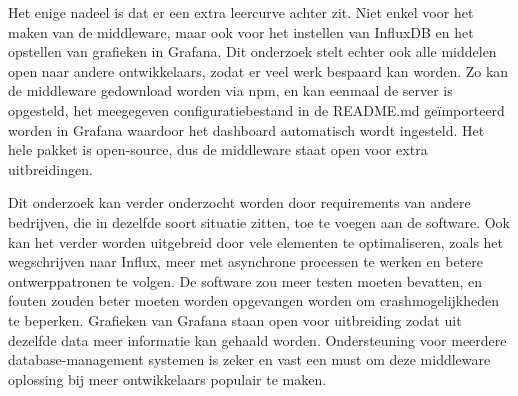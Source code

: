 Het enige nadeel is dat er een extra leercurve achter zit. Niet enkel voor het maken van de middleware, maar ook voor het instellen van InfluxDB en het opstellen van grafieken in Grafana. Dit onderzoek stelt echter ook alle middelen open naar andere ontwikkelaars, zodat er veel werk bespaard kan worden. Zo kan de middleware gedownload worden via npm, en kan eenmaal de server is opgesteld, het meegegeven configuratiebestand in de README.md geïmporteerd worden in Grafana waardoor het dashboard automatisch wordt ingesteld. Het hele pakket is open-source, dus de middleware staat open voor extra uitbreidingen.

Dit onderzoek kan verder onderzocht worden door requirements van andere bedrijven, die in dezelfde soort situatie zitten, toe te voegen aan de software. Ook kan het verder worden uitgebreid door vele elementen te optimaliseren, zoals het wegschrijven naar Influx, meer met asynchrone processen te werken en betere ontwerppatronen te volgen. De software zou meer testen moeten bevatten, en fouten zouden beter moeten worden opgevangen worden om crashmogelijkheden te beperken. Grafieken van Grafana staan open voor uitbreiding zodat uit dezelfde data meer informatie kan gehaald worden. Ondersteuning voor meerdere database-management systemen is zeker en vast een must om deze middleware oplossing bij meer ontwikkelaars populair te maken.
